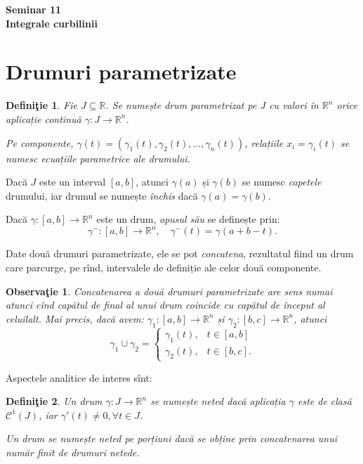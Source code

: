 \documentclass[11pt,a4paper]{article}
\newcommand\kal{\mathcal}
\newcommand\seq{\subseteq}
\newcommand\RR{\mathbb{R}}
\theoremstyle{dotless}
\theoremstyle{dotlessdr}
\newtheorem{definition}{Defini\c{t}ie}[section]
\newtheorem{remark}{Observa\c{t}ie}[section]
\begin{document}
\begin{center}
  {\large\textbf{Seminar 11 \\ Integrale curbilinii}}
\end{center}

\vspace{1cm}

\section{Drumuri parametrizate}
\label{sec:dr-par}

\begin{definition}\label{def:dr-par}
  Fie $J \seq \RR$. Se numește \emph{drum parametrizat} pe $J$ cu valori în $\RR^n$
  orice aplicație continuă $\gamma : J \to \RR^n$.

  Pe componente, $\gamma(t) = (\gamma_1(t), \gamma_2(t), \dots, \gamma_n(t))$,
  relațiile $x_i = \gamma_i(t)$ se numesc \emph{ecuațiile parametrice} ale drumului.
\end{definition}

Dacă $J$ este un interval $[a,b]$, atunci $\gamma(a)$ și $\gamma(b)$ se numesc
\emph{capetele} drumului, iar drumul se numește \emph{închis} dacă $\gamma(a) = \gamma(b)$.

Dacă $\gamma : [a, b] \to \RR^n$ este un drum, \emph{opusul său} se definește prin:
\[
  \gamma^- : [a, b] \to \RR^n, \quad \gamma^-(t) = \gamma(a + b - t).
\]

Date două drumuri parametrizate, ele se pot \emph{concatena}, rezultatul
fiind un drum care parcurge, pe rînd, intervalele de definiție ale celor
două componente.

\begin{remark}\label{rk:dr-concat}
  Concatenarea a două drumuri parametrizate are sens numai atunci cînd capătul
  de final al unui drum coincide cu capătul de început al celuilalt. Mai precis,
  dacă avem: $\gamma_1 : [a, b] \to \RR^n$ și $\gamma_2: [b, c] \to \RR^n$, atunci
  \[
    \gamma_1 \cup \gamma_2 =
    \begin{cases}
      \gamma_1(t), & t \in [a, b] \\
      \gamma_2(t), & t \in [b, c].
    \end{cases}
  \]
\end{remark}

Aspectele analitice de interes sînt:

\begin{definition}\label{def:neted}
  Un drum $\gamma : J \to \RR^n$ se numește \emph{neted} dacă aplicația $\gamma$
  este de clasă $\kal{C}^1(J)$, iar $\gamma'(t) \neq 0, \forall t \in J$.

  Un drum se numește \emph{neted pe porțiuni} dacă se obține prin concatenarea
  unui număr finit de drumuri netede.
\end{definition}
\end{document}
